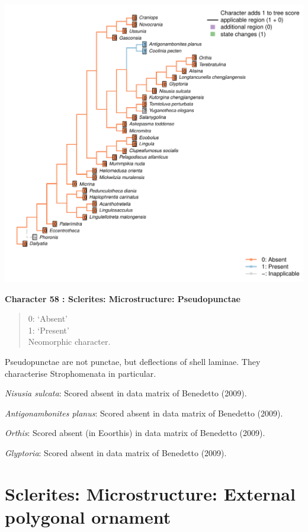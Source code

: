 \documentclass[]{book}
\theoremstyle{definition}
\theoremstyle{definition}
\theoremstyle{definition}
\theoremstyle{remark}
\begin{document}
\includegraphics{Brachiopod_phylogeny_files/figure-latex/unnamed-chunk-5-58.pdf}

\textbf{Character 58 : Sclerites: Microstructure: Pseudopunctae }

\begin{quote}
0: `Absent'\\
1: `Present'\\
Neomorphic character.
\end{quote}

Pseudopunctae are not punctae, but deflections of shell laminae. They
characterise Strophomenata in particular.

\emph{Nisusia sulcata}: Scored absent in data matrix of Benedetto
(2009).

\emph{Antigonambonites planus}: Scored absent in data matrix of
Benedetto (2009).

\emph{Orthis}: Scored absent (in Eoorthis) in data matrix of Benedetto
(2009).

\emph{Glyptoria}: Scored absent in data matrix of Benedetto (2009).

\hypertarget{sclerites-microstructure-external-polygonal-ornament}{%
\section*{Sclerites: Microstructure: External polygonal
ornament}\label{sclerites-microstructure-external-polygonal-ornament}}
\end{document}
